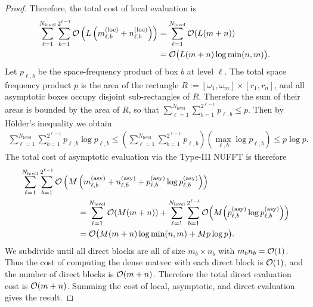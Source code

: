 \begin{proof}
    Therefore, the total cost of local evaluation is 
    \begin{align}
        \sum_{\ell=1}^{N_{\text{level}}} \sum_{b=1}^{2^{\ell-1}} \mathcal{O}\left(L\left(m_{\ell,b}^{(\text{loc})} + n_{\ell,b}^{(\text{loc})}\right)\right)
        &= \sum_{\ell=1}^{N_{\text{level}}} \mathcal{O}(L(m + n)) \\
        &= \mathcal{O}\big(L (m + n) \log \min(n,m)\big).
    \end{align}
    Let $p_{\ell,b}$ be the space-frequency product of box $b$ at level $\ell$.
    The total space frequency product $p$ is the area of the rectangle $R :=
    [\omega_1, \omega_m] \times [r_1, r_n]$, and all asymptotic boxes occupy
    disjoint sub-rectangles of $R$. Therefore the sum of their areas is bounded
    by the area of $R$, so that $\sum_{\ell=1}^{N_{\text{level}}}
    \sum_{b=1}^{2^{\ell-1}} p_{\ell,b} \leq p$. Then by H\"older's inequality we
    obtain 
    \begin{align} 
        \sum_{\ell=1}^{N_{\text{level}}} \sum_{b=1}^{2^{\ell-1}} p_{\ell,b} \log p_{\ell,b}
        \leq \left( \sum_{\ell=1}^{N_{\text{level}}} \sum_{b=1}^{2^{\ell-1}} p_{\ell,b} \right) \left(\max_{\ell,b} \log p_{\ell,b} \right) 
        \leq p \log p.
    \end{align}
    The total cost of asymptotic evaluation via the Type-III NUFFT is therefore
    \begin{align}
        & \sum_{\ell=1}^{N_{\text{level}}} \sum_{b=1}^{2^{\ell-1}} \bO\left(M\left(m_{\ell,b}^{(\text{asy})} + n_{\ell,b}^{(\text{asy})} + p_{\ell,b}^{(\text{asy})} \log p_{\ell,b}^{(\text{asy})} \right)\right) \\
        &\hspace*{0.2\textwidth} = \sum_{\ell=1}^{N_{\text{level}}} \bO(M(m + n)) + \sum_{\ell=1}^{N_{\text{level}}} \sum_{b=1}^{2^{\ell-1}} \bO\Big(M\Big(p_{\ell,b}^{(\text{asy})} \log p_{\ell,b}^{(\text{asy})}\Big)\Big) \\
        &\hspace*{0.2\textwidth} = \bO\big(M (m + n) \log \min(n,m) + Mp\log p\big).
    \end{align}
    We subdivide until all direct blocks are all of size $m_b \times n_b$ with
    $m_bn_b = \mathcal{O}(1)$. Thus the cost of computing the dense matvec with each
    direct block is $\mathcal{O}(1)$, and the number of direct blocks is $\mathcal{O}(m + n)$.
    Therefore the total direct evaluation cost is $\mathcal{O}(m + n)$. Summing the cost
    of local, asymptotic, and direct evaluation gives the result.
\end{proof}

